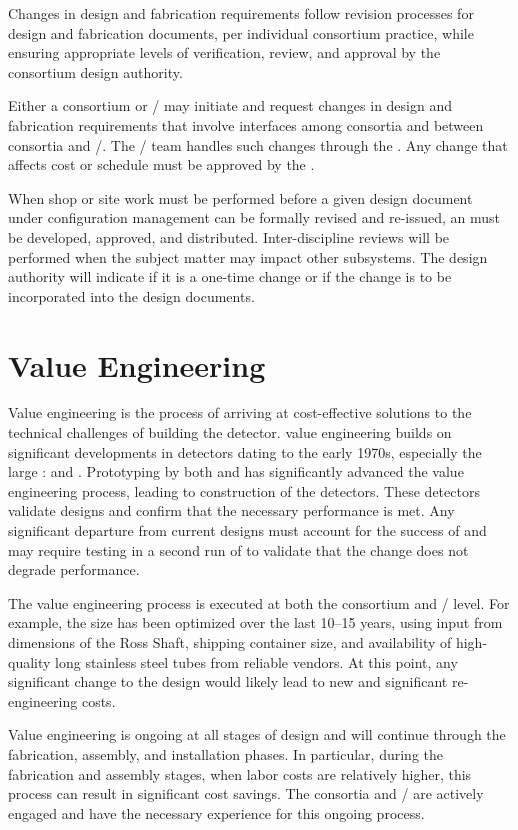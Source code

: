 Changes in design and fabrication requirements follow revision
processes for design and fabrication documents, per individual
consortium practice, while ensuring appropriate levels of
verification, review, and approval by the consortium design authority.

Either a consortium or / may initiate and request
changes in design and fabrication requirements that involve interfaces
among consortia and between consortia and /.  The
/ team handles such changes through the
. Any change that affects cost or schedule must be approved
by the .

When shop or site work must be performed before a given 
design
document under configuration management can be formally revised and re-issued, 
an  must be developed, approved, and distributed. 
Inter-discipline reviews will be
performed when the  subject matter may impact other
subsystems. The design authority will indicate if it is a one-time
change or if the change is to be incorporated into the design
documents. 



\section{Value Engineering}
\label{sec:fdsp-coord-ve}

Value engineering is the process of arriving at cost-effective
solutions to the technical challenges of building the 
detector.  value engineering builds on significant
developments in  detectors dating to the early 1970s,
especially the large :  and
. Prototyping by both  and  has
significantly advanced the value engineering process, leading to
construction of the  detectors. These detectors validate
 designs and confirm that the necessary performance is
met. Any significant departure from current designs must account for
the success of   and may require testing in a second
run of  to validate that the change does not degrade performance. 

The value engineering process is executed at both the consortium and
/ level. For example, the  size has been optimized
over the last 10--15 years, using input from dimensions of the Ross
Shaft, shipping container size, and availability of high-quality long
stainless steel tubes from reliable vendors.  At this point, any
significant change to the  design would likely lead to new
and significant re-engineering costs.

Value engineering is ongoing at all stages of design and will continue
through the fabrication, assembly, and installation phases. In
particular, during the fabrication and assembly stages, when labor costs
are relatively higher, this process can result in significant cost savings. The
consortia and / are actively engaged and have the necessary
experience for this ongoing process.
